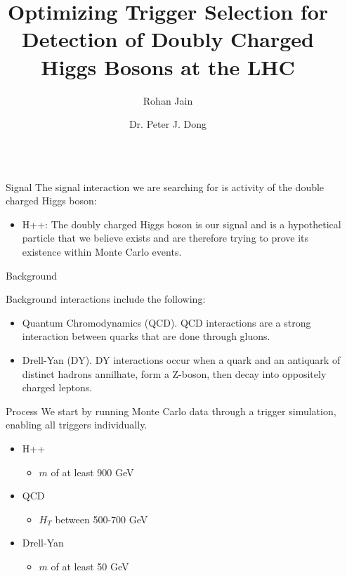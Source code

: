 \documentclass{beamer}
\title{Optimizing Trigger Selection for Detection of Doubly Charged Higgs Bosons at the LHC}
\author{Rohan Jain \and Dr. Peter J. Dong}
\institute[shortinst]{ {\texttt{rjain@imsa.edu} \samelineand  \texttt{pdong@imsa.edu} \\

Illinois Mathematics and Science Academy
}}
\newlength{\sepwidth}
\newlength{\colwidth}
\newcommand{\separatorcolumn}{\begin{column}{\sepwidth}\end{column}}
\begin{document}
\begin{frame}[t]
\begin{columns}[t]
\separatorcolumn

\begin{column}{\colwidth}

\begin{block}{Signal}
  The signal interaction we are searching for is activity of the double charged Higgs boson:

  \begin{itemize}
    \item H++: The doubly charged Higgs boson is our signal and is a hypothetical particle that we believe exists and are therefore trying to prove its existence within Monte Carlo events.
  \end{itemize}
\end{block}

  \begin{block}{Background}

    Background interactions include the following:

    \begin{itemize}
      \item Quantum Chromodynamics (QCD). QCD interactions are a strong interaction between quarks that are done through gluons. 
      \item Drell-Yan (DY). DY interactions occur when a quark and an antiquark of distinct hadrons annilhate, form a Z-boson, then decay into oppositely charged leptons.
    \end{itemize}
  \end{block}

  \begin{block}{Process}
    We start by running Monte Carlo data through a trigger simulation, enabling all triggers individually.

    \begin{itemize}
        \item H++
        \begin{itemize}
              \item $m$ of at least 900 GeV
        \end{itemize}
        \item QCD
        \begin{itemize}
                \item $H_T$ between 500-700 GeV
        \end{itemize}
        \item Drell-Yan
        \begin{itemize}
                \item $m$ of at least 50 GeV
        \end{itemize}
    \end{itemize}
  \end{block}


\end{column}
\end{columns}
\end{frame}
\end{document}
